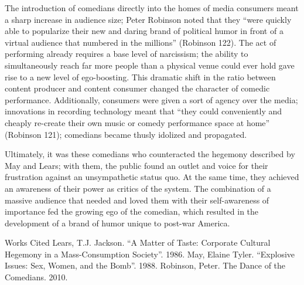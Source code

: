 The introduction of comedians directly into the homes of media consumers meant a
sharp increase in audience size; Peter Robinson noted that they ``were quickly
able to popularize their new and daring brand of political humor in front of a
virtual audience that numbered in the millions'' (Robinson 122). The act of
performing already requires a base level of narcissism; the ability to
simultaneously reach far more people than a physical venue could ever hold gave
rise to a new level of ego-boosting. This dramatic shift in the ratio between
content producer and content consumer changed the character of comedic
performance. Additionally, consumers were given a sort of agency over the media;
innovations in recording technology meant that ``they could conveniently and
cheaply re-create their own music or comedy performance space at home'' (Robinson
121); comedians became thusly idolized and propagated.

Ultimately, it was these comedians who counteracted the hegemony described by
May and Lears; with them, the public found an outlet and voice for their
frustration against an unsympathetic status quo. At the same time, they achieved
an awareness of their power as critics of the system. The combination of a
massive audience that needed and loved them with their self-awareness of
importance fed the growing ego of the comedian, which resulted in the
development of a brand of humor unique to post-war America.

Works Cited
Lears, T.J. Jackson. ``A Matter of Taste: Corporate Cultural Hegemony in a
Mass-Consumption Society''. 1986.
May, Elaine Tyler. ``Explosive Issues: Sex, Women, and the Bomb''. 1988.
Robinson, Peter. The Dance of the Comedians. 2010.
